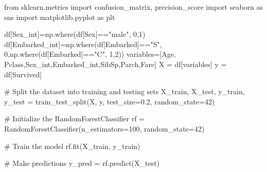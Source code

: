 \documentclass[
  letterpaper,
  DIV=11,
  numbers=noendperiod]{scrreprt}
\newenvironment{Shaded}{\begin{snugshade}}{\end{snugshade}}
\newcommand{\CommentTok}[1]{\textcolor[rgb]{0.37,0.37,0.37}{#1}}
\newcommand{\DecValTok}[1]{\textcolor[rgb]{0.68,0.00,0.00}{#1}}
\newcommand{\FloatTok}[1]{\textcolor[rgb]{0.68,0.00,0.00}{#1}}
\newcommand{\ImportTok}[1]{\textcolor[rgb]{0.00,0.46,0.62}{#1}}
\newcommand{\NormalTok}[1]{\textcolor[rgb]{0.00,0.23,0.31}{#1}}
\newcommand{\OperatorTok}[1]{\textcolor[rgb]{0.37,0.37,0.37}{#1}}
\newcommand{\StringTok}[1]{\textcolor[rgb]{0.13,0.47,0.30}{#1}}
\begin{document}
\begin{Shaded}
\begin{Highlighting}[]
\ImportTok{from}\NormalTok{ sklearn.metrics }\ImportTok{import}\NormalTok{ confusion\_matrix, precision\_score}
\ImportTok{import}\NormalTok{ seaborn }\ImportTok{as}\NormalTok{ sns}
\ImportTok{import}\NormalTok{ matplotlib.pyplot }\ImportTok{as}\NormalTok{ plt}

\NormalTok{df[}\StringTok{\textquotesingle{}Sex\_int\textquotesingle{}}\NormalTok{]}\OperatorTok{=}\NormalTok{np.where(df[}\StringTok{\textquotesingle{}Sex\textquotesingle{}}\NormalTok{]}\OperatorTok{==}\StringTok{"male"}\NormalTok{, }\DecValTok{0}\NormalTok{,}\DecValTok{1}\NormalTok{)}
\NormalTok{df[}\StringTok{\textquotesingle{}Embarked\_int\textquotesingle{}}\NormalTok{]}\OperatorTok{=}\NormalTok{np.where(df[}\StringTok{\textquotesingle{}Embarked\textquotesingle{}}\NormalTok{]}\OperatorTok{==}\StringTok{"S"}\NormalTok{, }\DecValTok{0}\NormalTok{,np.where(df[}\StringTok{\textquotesingle{}Embarked\textquotesingle{}}\NormalTok{]}\OperatorTok{==}\StringTok{"C"}\NormalTok{, }\DecValTok{1}\NormalTok{,}\DecValTok{2}\NormalTok{))}
\NormalTok{variables}\OperatorTok{=}\NormalTok{[}\StringTok{\textquotesingle{}Age\textquotesingle{}}\NormalTok{, }\StringTok{\textquotesingle{}Pclass\textquotesingle{}}\NormalTok{,}\StringTok{\textquotesingle{}Sex\_int\textquotesingle{}}\NormalTok{,}\StringTok{\textquotesingle{}Embarked\_int\textquotesingle{}}\NormalTok{,}\StringTok{\textquotesingle{}SibSp\textquotesingle{}}\NormalTok{,}\StringTok{\textquotesingle{}Parch\textquotesingle{}}\NormalTok{,}\StringTok{\textquotesingle{}Fare\textquotesingle{}}\NormalTok{]}
\NormalTok{X }\OperatorTok{=}\NormalTok{ df[variables]}
\NormalTok{y }\OperatorTok{=}\NormalTok{ df[}\StringTok{\textquotesingle{}Survived\textquotesingle{}}\NormalTok{]}

\CommentTok{\# Split the dataset into training and testing sets}
\NormalTok{X\_train, X\_test, y\_train, y\_test }\OperatorTok{=}\NormalTok{ train\_test\_split(X, y, test\_size}\OperatorTok{=}\FloatTok{0.2}\NormalTok{, random\_state}\OperatorTok{=}\DecValTok{42}\NormalTok{)}

\CommentTok{\# Initialize the RandomForestClassifier}
\NormalTok{rf }\OperatorTok{=}\NormalTok{ RandomForestClassifier(n\_estimators}\OperatorTok{=}\DecValTok{100}\NormalTok{, random\_state}\OperatorTok{=}\DecValTok{42}\NormalTok{)}

\CommentTok{\# Train the model}
\NormalTok{rf.fit(X\_train, y\_train)}

\CommentTok{\# Make predictions}
\NormalTok{y\_pred }\OperatorTok{=}\NormalTok{ rf.predict(X\_test)}


\end{Highlighting}
\end{Shaded}
\end{document}
